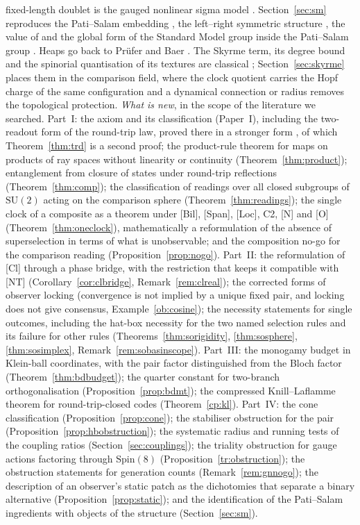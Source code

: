 \documentclass[aps,pra,onecolumn,superscriptaddress,nofootinbib,10pt]{revtex4-2}
\theoremstyle{definition}
\theoremstyle{remark}
\newcommand{\SU}{\mathrm{SU}}
\begin{document}
fixed-length doublet is the gauged nonlinear sigma model \cite{AB80}.  Section~\ref{sec:sm} reproduces the
Pati--Salam embedding \cite{PatiSalam}, the left--right symmetric structure
\cite{MohapatraPati,SenjanovicMohapatra}, the value of \cite{GQW} and the global form of the Standard Model
group inside the Pati--Salam group \cite{BaezHuerta}.  Heaps go back to Pr\"ufer and Baer
\cite{Prufer24,Baer29}.  The Skyrme term, its degree bound and the spinorial quantisation of its
textures are classical \cite{n6:skyrme,n6:faddeev,n6:fr-original,n6:giulini}; Section~\ref{sec:skyrme}
places them in the comparison field, where the clock quotient carries the Hopf charge of the same
configuration and a dynamical connection or radius removes the topological protection.
\emph{What is new}, in the scope of the literature we searched.  Part~I: the axiom and its classification
(Paper~I), including the two-readout form of the round-trip law, proved there in a stronger form
\cite[Thm.~4.5]{PaperI}, of which Theorem~\ref{thm:trd} is a second proof; the product-rule theorem
for maps on products of ray spaces without linearity or continuity (Theorem~\ref{thm:product});
entanglement from closure of states under round-trip reflections (Theorem~\ref{thm:comp}); the
classification of readings over all closed subgroups of $\SU(2)$ acting on the comparison sphere
(Theorem~\ref{thm:readings}); the single clock of a composite as a theorem under [Bil], [Span], [Loc], C2, [N] and [O]
(Theorem~\ref{thm:oneclock}), mathematically a reformulation of the absence of superselection in terms of what is
unobservable; and the composition no-go for the comparison reading (Proposition~\ref{prop:nogo}).  Part~II: the
reformulation of [Cl] through a phase bridge, with the restriction that keeps it compatible with [NT]
(Corollary~\ref{cor:clbridge}, Remark~\ref{rem:clreal}); the corrected forms of observer locking (convergence is not implied by
a unique fixed pair, and locking does not give consensus, Example~\ref{ob:cosine}); the necessity statements for single
outcomes, including the hat-box necessity for the two named selection rules and its failure for other rules
(Theorems~\ref{thm:sorigidity}, \ref{thm:sosphere}, \ref{thm:sosimplex}, Remark~\ref{rem:sobasinscope}).  Part~III: the monogamy budget in Klein-ball
coordinates, with the pair factor distinguished from the Bloch factor (Theorem~\ref{thm:bdbudget}); the quarter constant
for two-branch orthogonalisation (Proposition~\ref{prop:bdmt}); the compressed Knill--Laflamme theorem for round-trip-closed
codes (Theorem~\ref{cp:kl}).  Part~IV: the cone classification (Proposition~\ref{prop:cone}); the stabiliser obstruction for the pair
(Proposition~\ref{prop:hbobstruction}); the systematic radius and running tests of the coupling ratios (Section~\ref{sec:couplings}); the
triality obstruction for gauge actions factoring through $\mathrm{Spin}(8)$ (Proposition~\ref{tr:obstruction}); the obstruction statements
for generation counts (Remark~\ref{rem:gnnogo}); the description of an observer's static patch as the dichotomies that
separate a binary alternative (Proposition~\ref{prop:static}); and the identification of the Pati--Salam ingredients
with objects of the structure (Section~\ref{sec:sm}).
\end{document}
